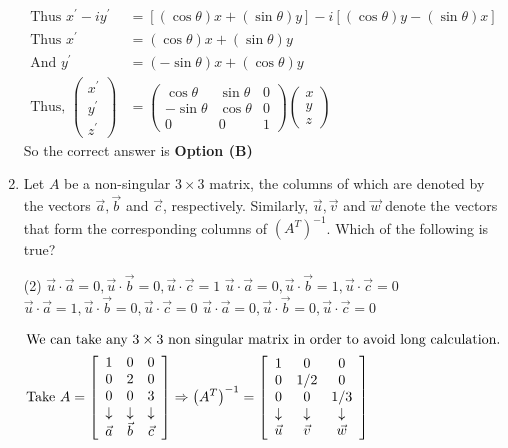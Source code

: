 \begin{enumerate}[label=\color{ocre}\textbf{\arabic*.}]
\begin{answer}
\begin{align*}
		\text{Thus }x^{\prime}-i y^{\prime}&=[(\cos \theta) x+(\sin \theta) y]-i[(\cos \theta) y-(\sin \theta) x]\\
		\text{Thus }x^{\prime}&=(\cos \theta) x+(\sin \theta) y\\
		\text{And }y^{\prime}&=(-\sin \theta) x+(\cos \theta) y\\
		\text{Thus, }\left(\begin{array}{l}x^{\prime} \\ y^{\prime} \\ z^{\prime}\end{array}\right)&=\left(\begin{array}{ccc}\cos \theta & \sin \theta & 0 \\ -\sin \theta & \cos \theta & 0 \\ 0 & 0 & 1\end{array}\right)\left(\begin{array}{l}x \\ y \\ z\end{array}\right)
		\end{align*}
		So the correct answer is \textbf{Option (B)}
	\end{answer}
	\item  Let $A$ be a non-singular $3 \times 3$ matrix, the columns of which are denoted by the vectors $\vec{a}, \vec{b}$ and $\vec{c}$, respectively. Similarly, $\vec{u}, \vec{v}$ and $\vec{w}$ denote the vectors that form the corresponding columns of $\left(A^{T}\right)^{-1}$. Which of the following is true?
	{}
	\begin{tasks}(2)
		\task[\textbf{A.}] $\vec{u} \cdot \vec{a}=0, \vec{u} \cdot \vec{b}=0, \vec{u} \cdot \vec{c}=1$
		\task[\textbf{B.}]  $\vec{u} \cdot \vec{a}=0, \vec{u} \cdot \vec{b}=1, \vec{u} \cdot \vec{c}=0$
		\task[\textbf{C.}] $\vec{u} \cdot \vec{a}=1, \vec{u} \cdot \vec{b}=0, \vec{u} \cdot \vec{c}=0$
		\task[\textbf{D.}]  $\vec{u} \cdot \vec{a}=0, \vec{u} \cdot \vec{b}=0, \vec{u} \cdot \vec{c}=0$
	\end{tasks}
	\begin{answer}
		\begin{align*}
		\intertext{We can take any $3 \times 3$ non singular matrix in order to avoid long calculation.}
		\text{Take }A&=\left[\begin{array}{ccc}1 & 0 & 0 \\ 0 & 2 & 0 \\ 0 & 0 & 3 \\ \downarrow & \downarrow & \downarrow \\ \vec{a} & \vec{b} & \vec{c}\end{array}\right] \Rightarrow\left(A^{T}\right)^{-1}=\left[\begin{array}{ccc}1 & 0 & 0 \\ 0 & 1 / 2 & 0 \\ 0 & 0 & 1 / 3 \\ \downarrow & \downarrow & \downarrow \\ \vec{u} & \vec{v} & \vec{w}\end{array}\right]

\end{align*}
\end{answer}
\end{enumerate}
